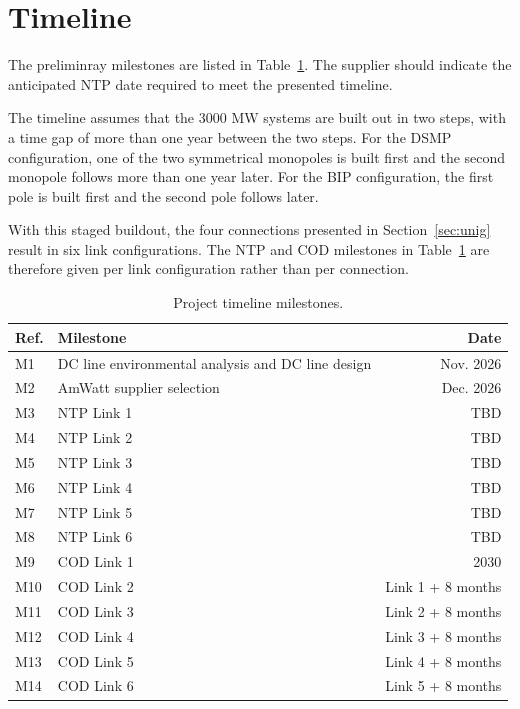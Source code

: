 \section{Timeline}
\label{sec:timeline}

The preliminray milestones are listed in Table~\ref{tab:timeline-milestones}. The supplier should indicate the 
anticipated NTP date required to meet the presented timeline.

The timeline assumes that the 3000 MW systems are built out in two steps, with a time gap of more than
one year between the two steps. For the DSMP configuration, one of the two symmetrical monopoles is
built first and the second monopole follows more than one year later. For the BIP configuration, the first pole
is built first and the second pole follows later.

With this staged buildout, the four connections presented in Section~\ref{sec:unig} result in six link configurations. The
NTP and COD milestones in Table~\ref{tab:timeline-milestones} are therefore given per link configuration rather than per connection.

\begin{table}[htbp]
  \centering
  \renewcommand{\arraystretch}{1.3}
   \begin{tabular}{@{}l l r@{}}
    \toprule
    \textbf{Ref.} & \textbf{Milestone} & \textbf{Date} \\
    \midrule
    M1 & DC line environmental analysis and DC line design & Nov. 2026 \\
    M2 & AmWatt supplier selection & Dec. 2026 \\
    M3 & NTP Link 1 & TBD \\
    M4 & NTP Link 2 & TBD \\
    M5 & NTP Link 3 & TBD \\
    M6 & NTP Link 4 & TBD \\
    M7 & NTP Link 5 & TBD \\
    M8 & NTP Link 6 & TBD \\
    M9 & COD Link 1 & 2030 \\
    M10 & COD Link 2 & Link 1 + 8 months \\
    M11 & COD Link 3 & Link 2 + 8 months \\
    M12 & COD Link 4 & Link 3 + 8 months \\
    M13 & COD Link 5 & Link 4 + 8 months \\
    M14 & COD Link 6 & Link 5 + 8 months \\
    \bottomrule
  \end{tabular}
  \caption{Project timeline milestones.}
  \label{tab:timeline-milestones}
\end{table}

